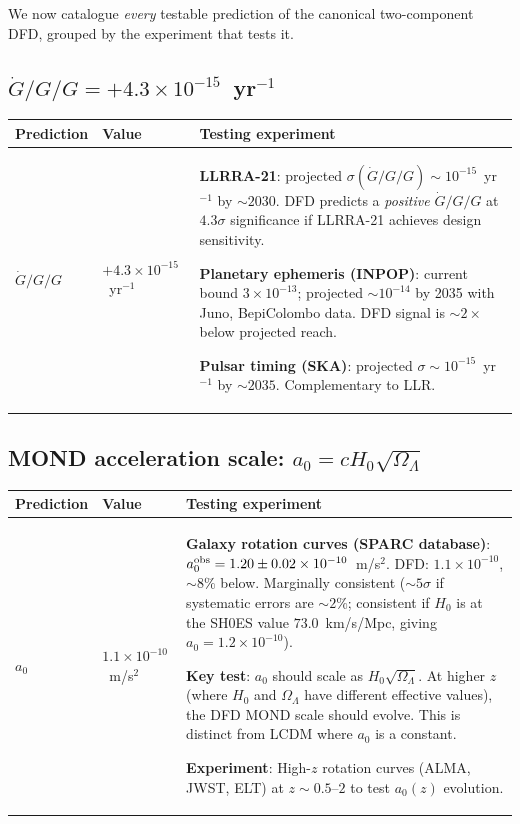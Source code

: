 \documentclass[11pt]{article}
\newcommand{\ee}[1]{\times 10^{#1}}
\newcommand{\Gdot}{\dot{G}/G}
\newcommand{\aM}{a_0}
\newcommand{\Hzero}{H_0}
\begin{document}
We now catalogue \emph{every} testable prediction of the canonical
two-component DFD, grouped by the experiment that tests it.

\subsection{$\Gdot/G = +4.3\ee{-15}$~yr$^{-1}$}

\begin{table}[H]
\centering
\begin{tabular}{p{3cm}p{3cm}p{6cm}}
\toprule
\textbf{Prediction} & \textbf{Value} & \textbf{Testing experiment} \\
\midrule
$\Gdot/G$ & $+4.3\ee{-15}$~yr$^{-1}$ &
  \textbf{LLRRA-21}: projected $\sigma(\Gdot/G) \sim 10^{-15}$~yr$^{-1}$
  by $\sim 2030$. DFD predicts a \emph{positive} $\Gdot/G$ at $4.3\sigma$
  significance if LLRRA-21 achieves design sensitivity.

  \textbf{Planetary ephemeris (INPOP)}: current bound $3\ee{-13}$; projected
  $\sim 10^{-14}$ by 2035 with Juno, BepiColombo data. DFD signal is
  $\sim 2\times$ below projected reach.

  \textbf{Pulsar timing (SKA)}: projected $\sigma \sim 10^{-15}$~yr$^{-1}$
  by $\sim 2035$. Complementary to LLR. \\
\bottomrule
\end{tabular}
\end{table}

\subsection{MOND acceleration scale: $\aM = c\Hzero\sqrt{\Omega_\Lambda}$}

\begin{table}[H]
\centering
\begin{tabular}{p{3cm}p{3cm}p{6cm}}
\toprule
\textbf{Prediction} & \textbf{Value} & \textbf{Testing experiment} \\
\midrule
$\aM$ & $1.1\ee{-10}$~m/s$^2$ &
  \textbf{Galaxy rotation curves (SPARC database)}: $a_0^{\rm obs} =
  1.20 \pm 0.02\ee{-10}$~m/s$^2$. DFD: $1.1\ee{-10}$, $\sim 8\%$ below.
  Marginally consistent ($\sim 5\sigma$ if systematic errors are $\sim 2\%$;
  consistent if $\Hzero$ is at the SH0ES value $73.0$~km/s/Mpc, giving
  $\aM = 1.2\ee{-10}$).

  \textbf{Key test}: $\aM$ should scale as $\Hzero\sqrt{\Omega_\Lambda}$.
  At higher $z$ (where $\Hzero$ and $\Omega_\Lambda$ have different effective
  values), the DFD MOND scale should evolve. This is distinct from LCDM
  where $a_0$ is a constant.

  \textbf{Experiment}: High-$z$ rotation curves (ALMA, JWST, ELT) at
  $z \sim 0.5$--$2$ to test $\aM(z)$ evolution. \\
\bottomrule
\end{tabular}
\end{table}
\end{document}
